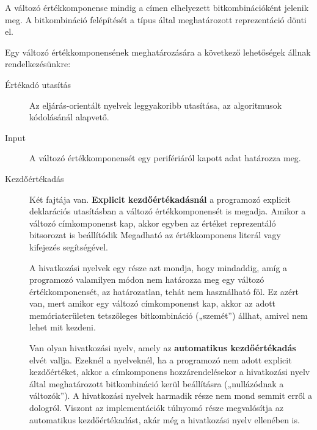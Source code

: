 A változó értékkomponense mindig a címen elhelyezett bitkombinációként jelenik meg. A bitkombináció felépítését a típus által meghatározott reprezentáció dönti el.

Egy változó értékkomponensének meghatározására a következő lehetőségek állnak rendelkezésünkre:
\begin{description}
	\item[Értékadó utasítás] Az eljárás-orientált nyelvek leggyakoribb utasítása, az algoritmusok kódolásánál alapvető.
	\item[Input] A változó értékkomponensét egy perifériáról kapott adat határozza meg.
	\item[Kezdőértékadás] Két fajtája van. \textbf{Explicit kezdőértékadásnál} a programozó explicit deklarációs utasításban a változó értékkomponensét is megadja. Amikor a változó címkomponenst kap, akkor egyben az értéket reprezentáló bitsorozat is beállítódik Megadható az értékkomponens literál vagy kifejezés segítségével.
	
	A hivatkozási nyelvek egy része azt mondja, hogy mindaddig, amíg a programozó valamilyen módon nem határozza meg egy változó értékkomponensét, az határozatlan, tehát nem használható föl. Ez azért van, mert amikor egy változó címkomponenst kap, akkor az adott memóriaterületen tetszőleges bitkombináció („szemét”) állhat, amivel nem lehet mit kezdeni.
	
	Van olyan hivatkozási nyelv, amely az \textbf{automatikus kezdőértékadás} elvét vallja. Ezeknél a nyelveknél, ha a programozó nem adott explicit kezdőértéket, akkor a címkomponens hozzárendelésekor a hivatkozási nyelv által meghatározott bitkombináció kerül beállításra („nullázódnak a változók”). A hivatkozási nyelvek harmadik része nem mond semmit erről a dologról. Viszont az implementációk túlnyomó része megvalósítja az automatikus kezdőértékadást, akár még a hivatkozási nyelv ellenében is.
\end{description}

